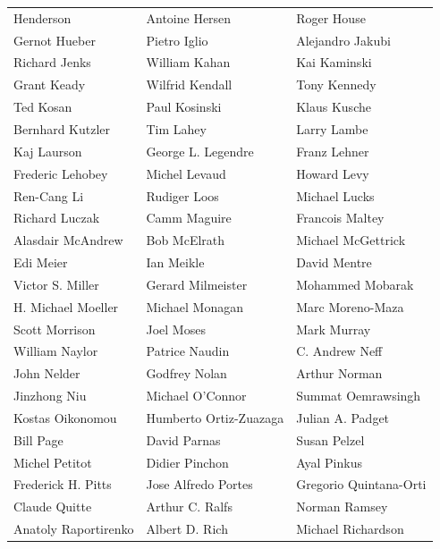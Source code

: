 \begin{tabular}{lll}
Henderson              & Antoine Hersen         & Roger House\\
Gernot Hueber          & Pietro Iglio           & Alejandro Jakubi\\
Richard Jenks          & William Kahan          & Kai Kaminski\\
Grant Keady            & Wilfrid Kendall        & Tony Kennedy\\
Ted Kosan              & Paul Kosinski          & Klaus Kusche\\
Bernhard Kutzler       & Tim Lahey              & Larry Lambe\\
Kaj Laurson            & George L. Legendre     & Franz Lehner\\
Frederic Lehobey       & Michel Levaud          & Howard Levy\\
Ren-Cang Li            & Rudiger Loos           & Michael Lucks\\
Richard Luczak         & Camm Maguire           & Francois Maltey\\
Alasdair McAndrew      & Bob McElrath           & Michael McGettrick\\
Edi Meier              & Ian Meikle             & David Mentre\\
Victor S. Miller       & Gerard Milmeister      & Mohammed Mobarak\\
H. Michael Moeller     & Michael Monagan        & Marc Moreno-Maza\\
Scott Morrison         & Joel Moses             & Mark Murray\\
William Naylor         & Patrice Naudin         & C. Andrew Neff\\
John Nelder            & Godfrey Nolan          & Arthur Norman\\
Jinzhong Niu           & Michael O'Connor       & Summat Oemrawsingh\\
Kostas Oikonomou       & Humberto Ortiz-Zuazaga & Julian A. Padget\\
Bill Page              & David Parnas           & Susan Pelzel\\
Michel Petitot         & Didier Pinchon         & Ayal Pinkus\\
Frederick H. Pitts     & Jose Alfredo Portes    & Gregorio Quintana-Orti\\
Claude Quitte          & Arthur C. Ralfs        & Norman Ramsey\\
Anatoly Raportirenko   & Albert D. Rich         & Michael Richardson\\

\end{tabular}
